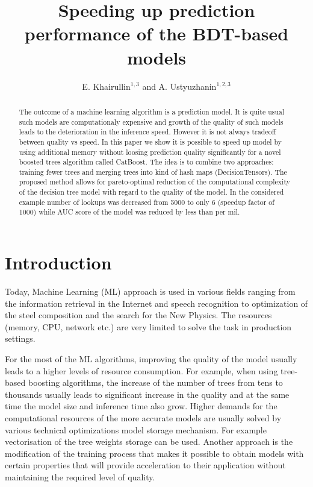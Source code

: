 \documentclass[a4paper]{jpconf}
\begin{document}
\title{Speeding up prediction performance of the BDT-based models}

\author{
 E. Khairullin$^{1, 3}$
 and
 A. Ustyuzhanin$^{1, 2, 3}$
}
\address{$^{1}$ Moscow Institute of Physics and Technology}
\address{$^{2}$ National Research University Higher School of Economics, 20 Myasnitskaya st., Moscow 101000, Russia}
\address{$^{3}$ Yandex School of Data Analysis, 11/2, Timura Frunze st., Moscow 119021, Russia}


\begin{abstract}
The outcome of a machine learning algorithm is a prediction model. It is quite usual such models are computationaly expensive and growth of the quality of such models leads to the deterioration in the inference speed. However it is not always tradeoff between quality vs speed. In this paper we show it is possible to speed up model by using additional memory without loosing prediction quality significantly for a novel boosted trees algorithm called CatBoost. The idea is to combine two approaches: training fewer trees and merging trees into kind of hash maps (DecisionTensors). The proposed method allows for pareto-optimal reduction of the computational complexity of the decision tree model with regard to the quality of the model. In the considered example number of lookups was decreased from 5000 to only 6 (speedup factor of 1000) while AUC score of the model was reduced by less than per mil.
\end{abstract}

\section{Introduction}
Today, Machine Learning (ML) approach is used in various fields ranging from the information retrieval in the Internet and speech recognition to optimization of the steel composition and the search for the New Physics.
The resources (memory, CPU, network etc.) are very limited to solve the task in production settings.

For the most of the ML algorithms, improving the quality of the model usually leads to a higher levels of resource consumption. For example, when using tree-based boosting algorithms, the increase of the number of trees from tens to thousands usually leads to significant increase in the quality and at the same time the model size and inference time also grow. Higher demands for the computational resources of the more accurate models are usually solved by various technical optimizations model storage mechanism. For example vectorisation of the tree weights storage can be used. Another approach is the modification of the training process that makes it possible to obtain models with certain properties that will provide acceleration to their application without maintaining the required level of quality.
\end{document}
